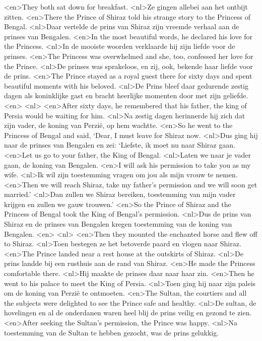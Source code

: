 <en>They both sat down for breakfast.
<nl>Ze gingen allebei aan het ontbijt zitten.
<en>There the Prince of Shiraz told his strange story to the Princess of Bengal.
<nl>Daar vertelde de prins van Shiraz zijn vreemde verhaal aan de prinses van Bengalen.
<en>In the most beautiful words, he declared his love for the Princess.
<nl>In de mooiste woorden verklaarde hij zijn liefde voor de prinses.
<en>The Princess was overwhelmed and she, too, confessed her love for the Prince.
<nl>De prinses was sprakeloos, en zij, ook, bekende haar liefde voor de prins.
<en>The Prince stayed as a royal guest there for sixty days and spent beautiful moments with his beloved.
<nl>De Prins bleef daar gedurende zestig dagen als koninklijke gast en bracht heerlijke momenten door met zijn geliefde.
<en>
<nl>
<en>After sixty days, he remembered that his father, the king of Persia would be waiting for him.
<nl>Na zestig dagen herinnerde hij zich dat zijn vader, de koning van Perzië, op hem  wachtte.
<en>So he went to the Princess of Bengal and said, `Dear, I must leave for Shiraz now.
<nl>Dus ging hij naar de prinses van Bengalen en zei: `Liefste, ik moet nu naar Shiraz gaan.
<en>Let us go to your father, the King of Bengal.
<nl>Laten we naar je vader gaan, de koning van Bengalen.
<en>I will ask his permission to take you as my wife.
<nl>Ik wil zijn toestemming vragen om jou als mijn vrouw te nemen.
<en>Then we will reach Shiraz, take my father's permission and we will soon get married.'
<nl>Dan zullen we Shiraz bereiken, toestemming van mijn vader krijgen en zullen we gauw trouwen.'
<en>So the Prince of Shiraz and the Princess of Bengal took the King of Bengal's permission.
<nl>Dus de prins van Shiraz en de prinses van Bengalen kregen toestemming van de koning van Bengalen.
<en>
<nl>
<en>Then they mounted the enchanted horse and flew off to Shiraz.
<nl>Toen bestegen ze het betoverde paard en vlogen naar Shiraz.
<en>The Prince landed near a rest house at the outskirts of Shiraz.
<nl>De prins landde bij een rusthuis aan de rand van Shiraz.
<en>He made the Princess comfortable there.
<nl>Hij maakte de prinses daar naar haar zin.
<en>Then he went to his palace to meet the King of Persia.
<nl>Toen ging hij naar zijn paleis om de koning van Perzië te ontmoeten.
<en>The Sultan, the courtiers and all the subjects were delighted to see the Prince safe and healthy.
<nl>De sultan, de hovelingen en al de onderdanen waren heel blij  de prins veilig en gezond te zien.
<en>After seeking the Sultan's permission, the Prince was happy.
<nl>Na toestemming van de Sultan te hebben gezocht, was de prins gelukkig.
